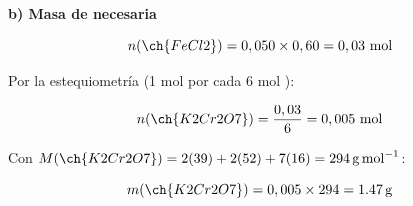 \begin{exerciseEVAU}
\begin{solu}
    \textbf{b) Masa de  necesaria}

    \begin{equation*}
        n(\ch{FeCl2}) = 0,050 \times 0,60 = 0,03 \ \text{mol}
    \end{equation*}

    Por la estequiometría (1 mol  por cada 6 mol ):

    \begin{equation*}
        n(\ch{K2Cr2O7}) = \dfrac{0,03}{6} = 0,005 \ \text{mol}
    \end{equation*}

    Con \(M(\ch{K2Cr2O7}) = 2(39)+2(52)+7(16) = \SI{294}{\gram\per\mole}\):

    \begin{equation*}
        m(\ch{K2Cr2O7}) = 0,005 \times 294 = \SI{1.47}{\gram}
    \end{equation*}

\end{solu}
\end{exerciseEVAU}

